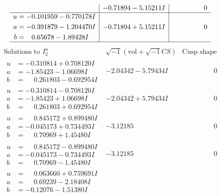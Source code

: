 \documentclass[1p]{elsarticle_modified}
\theoremstyle{definition}
\newcommand{\I}{\sqrt{-1}}
\begin{document}
$$\begin{array}{c|c|c}
 & -0.71894 - 5.15211 I & \phantom{-0.000000 } 0 \\ \hline\begin{aligned}
u &= -0.101959 - 0.770178 I \\
a &= -0.391879 - 1.204470 I \\
b &= \phantom{-}0.65678 - 1.89428 I\end{aligned}
 & -0.71894 + 5.15211 I & \phantom{-0.000000 } 0\\
 \hline 
 \end{array}$$\newpage$$\begin{array}{c|c|c}  
\text{Solutions to }I^u_{2}& \I (\text{vol} + \sqrt{-1}CS) & \text{Cusp shape}\\
 \hline 
\begin{aligned}
u &= -0.310814 + 0.708120 I \\
a &= -1.85423 - 1.06698 I \\
b &= \phantom{-}0.261803 - 0.692954 I\end{aligned}
 & -2.04342 - 5.79434 I & \phantom{-0.000000 } 0 \\ \hline\begin{aligned}
u &= -0.310814 - 0.708120 I \\
a &= -1.85423 + 1.06698 I \\
b &= \phantom{-}0.261803 + 0.692954 I\end{aligned}
 & -2.04342 + 5.79434 I & \phantom{-0.000000 } 0 \\ \hline\begin{aligned}
u &= \phantom{-}0.845172 + 0.899480 I \\
a &= -0.045173 + 0.734493 I \\
b &= \phantom{-}0.70969 + 1.45480 I\end{aligned}
 & -3.12185\phantom{ +0.000000I} & \phantom{-0.000000 } 0 \\ \hline\begin{aligned}
u &= \phantom{-}0.845172 - 0.899480 I \\
a &= -0.045173 - 0.734493 I \\
b &= \phantom{-}0.70969 - 1.45480 I\end{aligned}
 & -3.12185\phantom{ +0.000000I} & \phantom{-0.000000 } 0 \\ \hline\begin{aligned}
u &= \phantom{-}0.063660 + 0.759691 I \\
a &= \phantom{-}0.69239 - 2.18408 I \\
b &= -0.12076 - 1.51380 I\end{aligned}

\end{array}$$
\end{document}
